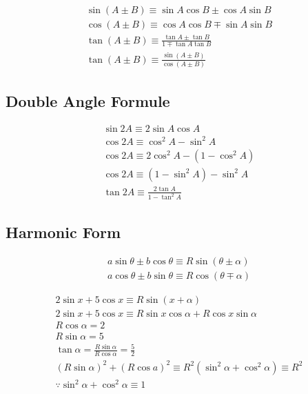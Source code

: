 \documentclass{article}
\begin{document}
\begin{gather}
	\sin ( A \pm B ) \equiv \sin A \cos B \pm \cos A \sin B \\
	\cos ( A \pm B ) \equiv \cos A \cos B \mp \sin A \sin B \\
	\tan ( A \pm B ) \equiv \frac{\tan A \pm \tan B}{1 \mp \tan A \tan B} \\
	\tan ( A \pm B ) \equiv \frac{\sin(A \pm B)}{\cos (A \pm B)}
\end{gather}

\subsection{Double Angle Formule}

\begin{gather}
	\sin 2A \equiv 2 \sin A \cos A \\
	\cos 2A \equiv \cos^2 A - \sin^2 A \\
	\cos 2A \equiv 2\cos^2 A - (1 - \cos^2 A) \\
	\cos 2A \equiv (1 - \sin^2 A) - \sin^2 A \\
	\tan 2A \equiv \frac{2 \tan A}{1 - \tan^2 A}
\end{gather}

\subsection{Harmonic Form}

\begin{gather}
	a \sin \theta \pm b \cos \theta \equiv R \sin (\theta \pm \alpha) \\
	a \cos \theta \pm b \sin \theta \equiv R \cos (\theta \mp \alpha)
\end{gather}

\begin{gather}
	2 \sin x + 5 \cos x \equiv R \sin (x + \alpha)\\
	2 \sin x + 5 \cos x \equiv R \sin x \cos \alpha + R \cos x \sin \alpha \\
	R \cos \alpha = 2 \\
	R \sin \alpha = 5 \\
	\tan \alpha = \frac{R \sin \alpha}{R \cos \alpha} = \frac{5}{2} \\
	(R \sin \alpha)^2 + (R \cos a)^2 \equiv R^2(\sin^2 \alpha + \cos ^2 \alpha) \equiv R^2 \\
	\because \sin^2 \alpha + \cos^2 \alpha \equiv 1
\end{gather}
\end{document}
